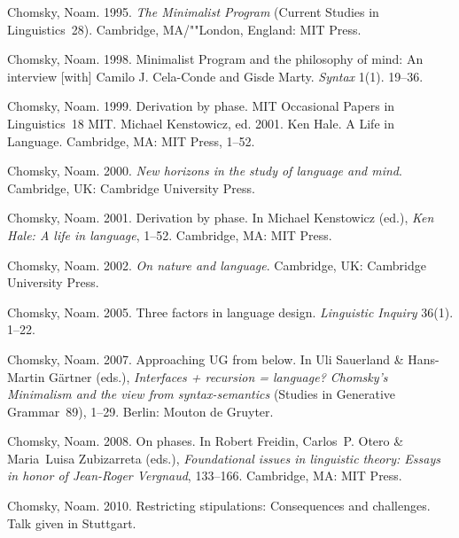 \begin{thebibliography}{1420}
Chomsky, Noam. 1995{}.
\newblock \emph{The {Minimalist Program}} (Current Studies in Linguistics~28).
\newblock Cambridge, MA/""London, England: MIT Press.

Chomsky, Noam. 1998.
 {Minimalist Program} and the philosophy of mind:
  {An} interview [with] {Camilo J. Cela-Conde and Gisde Marty}.
\newblock \emph{Syntax} 1(1). 19--36.

Chomsky, Noam. 1999.
\newblock Derivation by phase.
\newblock MIT Occasional Papers in Linguistics~18 MIT.
\newblock \reprintin Michael Kenstowicz, ed. 2001. Ken Hale. {A} Life in
  Language. Cambridge, MA: MIT Press, 1--52.

Chomsky, Noam. 2000.
\newblock \emph{New horizons in the study of language and mind}.
\newblock Cambridge, UK: Cambridge University Press.

Chomsky, Noam. 2001.
\newblock Derivation by phase.
\newblock In Michael Kenstowicz (ed.), \emph{{Ken Hale}: {A} life in language},
  1--52. Cambridge, MA: MIT Press.

Chomsky, Noam. 2002.
\newblock \emph{On nature and language}.
\newblock Cambridge, UK: Cambridge University Press.

Chomsky, Noam. 2005.
\newblock Three factors in language design.
\newblock \emph{Linguistic Inquiry} 36(1). 1--22.

Chomsky, Noam. 2007.
\newblock Approaching {UG} from below.
\newblock In Uli Sauerland \& Hans-Martin G{\"a}rtner (eds.), \emph{Interfaces
  + recursion = language? {Chomsky's Minimalism} and the view from
  syntax-semantics} (Studies in Generative Grammar~89), 1--29. Berlin: Mouton
  de Gruyter.

Chomsky, Noam. 2008.
\newblock On phases.
\newblock In Robert Freidin, Carlos~P. Otero \& Maria~Luisa Zubizarreta (eds.),
  \emph{Foundational issues in linguistic theory: {Essays} in honor of
  {Jean-Roger Vergnaud}}, 133--166. Cambridge, MA: MIT Press.

Chomsky, Noam. 2010.
\newblock Restricting stipulations: Consequences and challenges.
\newblock Talk given in Stuttgart.


\end{thebibliography}
